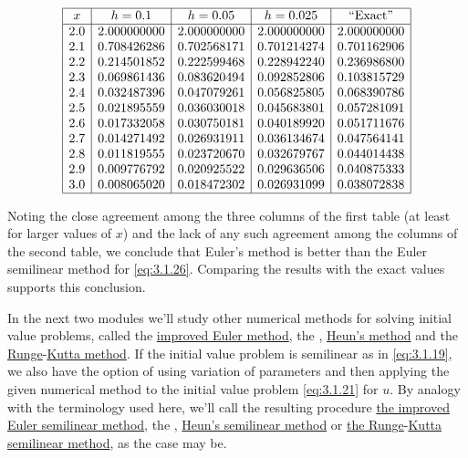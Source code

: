 \documentclass{ximera}
\begin{document}
\begin{example}
$$
\begin{array}{|c|c|c|c|c|}
\hline
x&
h=0.1&
h=0.05&
h=0.025&
\text{``Exact''} \\ \hline
2.0 &2.000000000 & 2.000000000 & 2.000000000 & 2.000000000 \\
2.1 &0.708426286 & 0.702568171 & 0.701214274 & 0.701162906 \\
2.2 &0.214501852 & 0.222599468 & 0.228942240 & 0.236986800 \\
2.3 &0.069861436 & 0.083620494 & 0.092852806 & 0.103815729 \\
2.4 &0.032487396 & 0.047079261 & 0.056825805 & 0.068390786 \\
2.5 &0.021895559 & 0.036030018 & 0.045683801 & 0.057281091 \\
2.6 &0.017332058 & 0.030750181 & 0.040189920 & 0.051711676 \\
2.7 &0.014271492 & 0.026931911 & 0.036134674 & 0.047564141 \\
2.8 &0.011819555 & 0.023720670 & 0.032679767 & 0.044014438 \\
2.9 &0.009776792 & 0.020925522 & 0.029636506 & 0.040875333 \\
3.0 &0.008065020 & 0.018472302 & 0.026931099 & 0.038072838 \\
\hline
\end{array}
$$


Noting the close
agreement among the  three columns of the first table (at
least for larger values of $x$) and the lack of any such agreement
among the columns of the second table, we conclude that
Euler's method is better than the Euler semilinear method for
\eqref{eq:3.1.26}. Comparing the results with the exact values
supports this conclusion.
\end{example}

In the next two modules we'll study other numerical methods for
solving initial value problems,  called the
\href{http://www-history.mcs.st-and.ac.uk/Mathematicians/Euler.html}{improved Euler method}, the ,
\href{http://www-history.mcs.st-and.ac.uk/Mathematicians/Heun.html}{Heun's method}
and the
\href{http://www-history.mcs.st-and.ac.uk/Mathematicians/Runge.html}{Runge}-\href{http://www-history.mcs.st-and.ac.uk/Mathematicians/Kutta.html}{Kutta method}.
 If the initial value problem is semilinear as
in \eqref{eq:3.1.19},  we also have the option of using variation of
parameters and then applying the given numerical method to the initial
value problem \eqref{eq:3.1.21} for $u$. By analogy with the terminology
used here, we'll call the resulting procedure
\href{http://www-history.mcs.st-and.ac.uk/Mathematicians/Euler.html}{the improved Euler semilinear method}, the ,
\href{http://www-history.mcs.st-and.ac.uk/Mathematicians/Heun.html}{Heun's semilinear method} or
\href{http://www-history.mcs.st-and.ac.uk/Mathematicians/Runge.html}{the Runge}-\href{http://www-history.mcs.st-and.ac.uk/Mathematicians/Kutta.html}{Kutta semilinear method}, as
the case may be.
\end{document}

